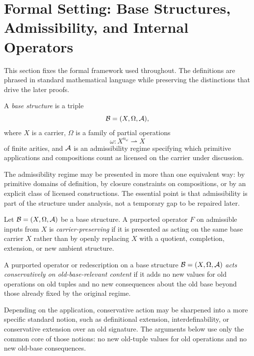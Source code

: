 \section{Formal Setting: Base Structures, Admissibility, and Internal Operators}\label{sec:formal-setting}

This section fixes the formal framework used throughout. The definitions are phrased in standard mathematical language while preserving the distinctions that drive the later proofs.

\begin{definition}
A \emph{base structure} is a triple
\[
\mathcal{B}=(X,\Omega,\mathcal{A}),
\]
where $X$ is a carrier, $\Omega$ is a family of partial operations
\[
\omega:X^{n_\omega}\rightharpoonup X
\]
of finite arities, and $\mathcal{A}$ is an admissibility regime specifying which primitive applications and compositions count as licensed on the carrier under discussion.
\end{definition}

\begin{remark}
The admissibility regime may be presented in more than one equivalent way: by primitive domains of definition, by closure constraints on compositions, or by an explicit class of licensed constructions. The essential point is that admissibility is part of the structure under analysis, not a temporary gap to be repaired later.
\end{remark}

\begin{definition}
Let $\mathcal{B}=(X,\Omega,\mathcal{A})$ be a base structure. A purported operator $F$ on admissible inputs from $X$ is \emph{carrier-preserving} if it is presented as acting on the same base carrier $X$ rather than by openly replacing $X$ with a quotient, completion, extension, or new ambient structure.
\end{definition}

\begin{definition}
A purported operator or redescription on a base structure $\mathcal{B}=(X,\Omega,\mathcal{A})$ \emph{acts conservatively on old-base-relevant content} if it adds no new values for old operations on old tuples and no new consequences about the old base beyond those already fixed by the original regime.
\end{definition}

\begin{remark}
Depending on the application, conservative action may be sharpened into a more specific standard notion, such as definitional extension, interdefinability, or conservative extension over an old signature. The arguments below use only the common core of those notions: no new old-tuple values for old operations and no new old-base consequences.
\end{remark}

